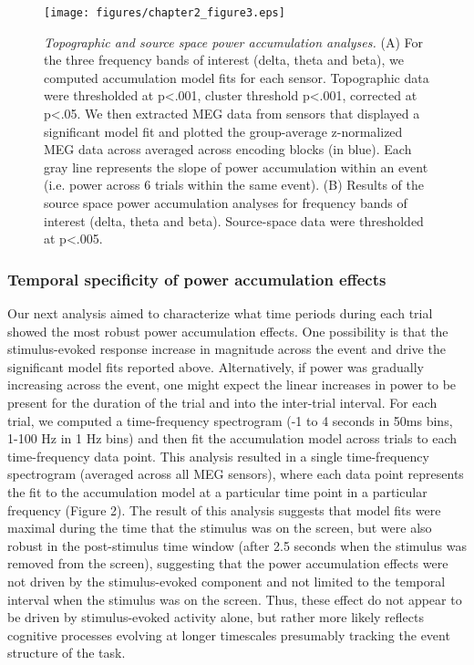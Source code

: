 \begin{figure}
  \centering
  \texttt{[image: figures/chapter2\_figure3.eps]}
  \caption[Topographic and source space power accumulation analyses]{\textit{Topographic and source space power accumulation analyses.} (A) For the three frequency bands of interest (delta, theta and beta), we computed accumulation model fits for each sensor.  Topographic data were thresholded at p<.001, cluster threshold p<.001, corrected at p<.05.  We then extracted MEG data from sensors that displayed a significant model fit and plotted the group-average z-normalized MEG data across averaged across encoding blocks (in blue).  Each gray line represents the slope of power accumulation within an event (i.e. power across 6 trials within the same event). (B) Results of the source space power accumulation analyses for frequency bands of interest (delta, theta and beta).  Source-space data were thresholded at p<.005.}
  \label{chapter2_figure3}
\end{figure}

\subsubsection{Temporal specificity of power accumulation
effects}\label{temporal-specificity-of-power-accumulation-effects}

Our next analysis aimed to characterize what time periods during each
trial showed the most robust power accumulation effects. One possibility
is that the stimulus-evoked response increase in magnitude across the
event and drive the significant model fits reported above.
Alternatively, if power was gradually increasing across the event, one
might expect the linear increases in power to be present for the
duration of the trial and into the inter-trial interval. For each trial,
we computed a time-frequency spectrogram (-1 to 4 seconds in 50ms bins,
1-100 Hz in 1 Hz bins) and then fit the accumulation model across trials
to each time-frequency data point. This analysis resulted in a single
time-frequency spectrogram (averaged across all MEG sensors), where each
data point represents the fit to the accumulation model at a particular
time point in a particular frequency (Figure 2). The result of this
analysis suggests that model fits were maximal during the time that the
stimulus was on the screen, but were also robust in the post-stimulus
time window (after 2.5 seconds when the stimulus was removed from the
screen), suggesting that the power accumulation effects were not driven
by the stimulus-evoked component and not limited to the temporal
interval when the stimulus was on the screen. Thus, these effect do not
appear to be driven by stimulus-evoked activity alone, but rather more
likely reflects cognitive processes evolving at longer timescales
presumably tracking the event structure of the task.

